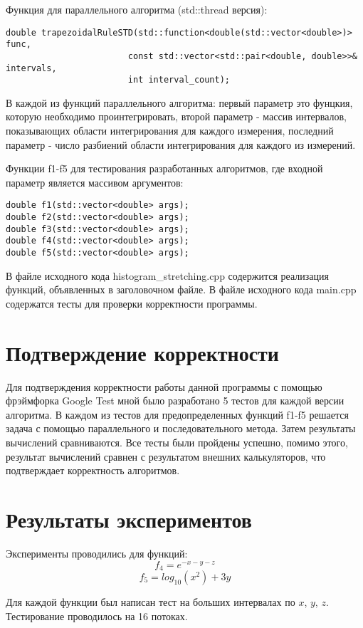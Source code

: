 \documentclass{report}
\begin{document}
\par Функция для параллельного алгоритма (std::thread версия):
\begin{lstlisting}
double trapezoidalRuleSTD(std::function<double(std::vector<double>)> func,
                        const std::vector<std::pair<double, double>>& intervals,
                        int interval_count);
\end{lstlisting}
\par В каждой из функций параллельного алгоритма: первый параметр это фунцкия, которую необходимо проинтегрировать, второй параметр - массив интервалов, показывающих области интегрирования для каждого измерения, последний параметр - число разбиений области интегрирования для каждого из измерений.
\par Функции f1-f5 для тестирования разработанных алгоритмов, где входной параметр является массивом аргументов:
\begin{lstlisting}
double f1(std::vector<double> args);
double f2(std::vector<double> args);
double f3(std::vector<double> args);
double f4(std::vector<double> args);
double f5(std::vector<double> args);
\end{lstlisting}
\par В файле исходного кода histogram\_stretching.cpp содержится реализация функций, объявленных в заголовочном файле. В файле исходного кода main.cpp содержатся тесты для проверки корректности программы.
\newpage

\section*{Подтверждение корректности}
Для подтверждения корректности работы данной программы с помощью фрэймфорка Google Test мной было разработано 5 тестов для каждой версии алгоритма. В каждом из тестов для предопределенных функций f1-f5 решается задача с помощью параллельного и последовательного метода. Затем результаты вычислений
сравниваются. Все тесты были пройдены успешно, помимо этого, результат вычислений сравнен с результатом внешних калькуляторов, что подтверждает корректность алгоритмов.
\newpage

\section*{Результаты экспериментов}
Эксперименты проводились для функций:
$$f_4 = e^{-x-y-z} $$
$$f_5 = log_{10}(x^2) + 3y $$
\par Для каждой функции был написан тест на больших интервалах по $x$, $y$, $z$. Тестирование проводилось на 16 потоках.
\end{document}
